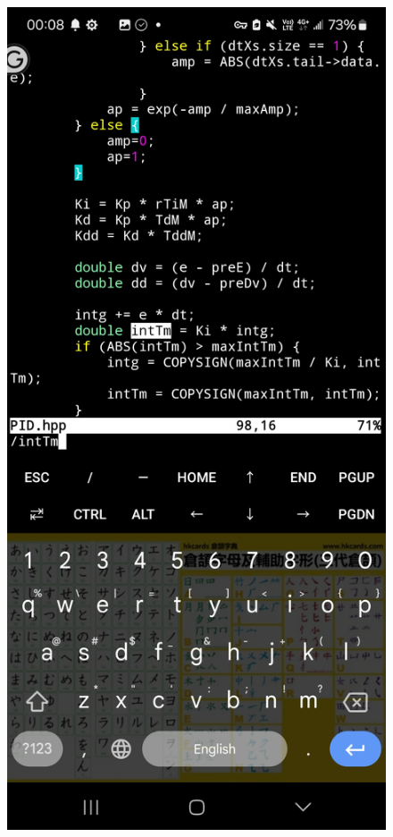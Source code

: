 \documentclass[a4paper,12pt]{article}
\begin{document}
\begin{center}
\begin{figure}[H]
\begin{minipage}[t]{0.45\textwidth}
\end{minipage}
\hfill
\begin{minipage}[t]{0.45\textwidth}
\centering
\includegraphics[width=\textwidth]{./working_screenshots/6.jpg}
\end{minipage}
\hfill
\end{figure}\FloatBarrier\end{center}
\end{document}
